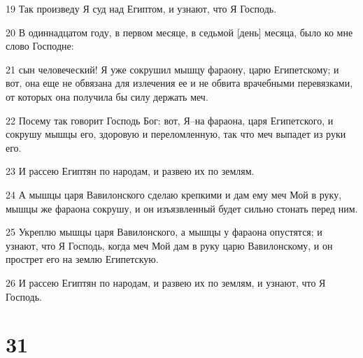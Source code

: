 \par 19 Так произведу Я суд над Египтом, и узнают, что Я Господь.
\par 20 В одиннадцатом году, в первом месяце, в седьмой [день] месяца, было ко мне слово Господне:
\par 21 сын человеческий! Я уже сокрушил мышцу фараону, царю Египетскому; и вот, она еще не обвязана для излечения ее и не обвита врачебными перевязками, от которых она получила бы силу держать меч.
\par 22 Посему так говорит Господь Бог: вот, Я--на фараона, царя Египетского, и сокрушу мышцы его, здоровую и переломленную, так что меч выпадет из руки его.
\par 23 И рассею Египтян по народам, и развею их по землям.
\par 24 А мышцы царя Вавилонского сделаю крепкими и дам ему меч Мой в руку, мышцы же фараона сокрушу, и он изъязвленный будет сильно стонать перед ним.
\par 25 Укреплю мышцы царя Вавилонского, а мышцы у фараона опустятся; и узнают, что Я Господь, когда меч Мой дам в руку царю Вавилонскому, и он прострет его на землю Египетскую.
\par 26 И рассею Египтян по народам, и развею их по землям, и узнают, что Я Господь.

\chapter{31}

